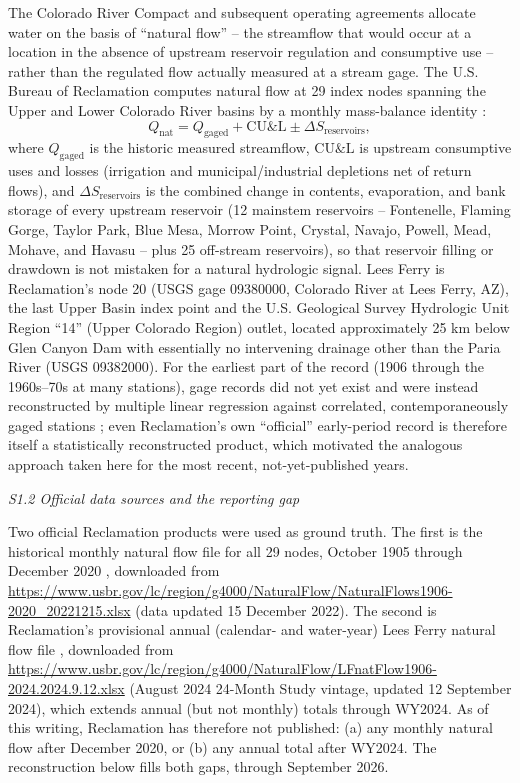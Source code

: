 \documentclass[draft,grl]{agutexSI2019}
\begin{document}
\begin{article}
The Colorado River Compact and subsequent operating agreements allocate water on the basis of ``natural flow'' -- the streamflow that would occur at a location in the absence of upstream reservoir regulation and consumptive use -- rather than the regulated flow actually measured at a stream gage. The U.S. Bureau of Reclamation computes natural flow at 29 index nodes spanning the Upper and Lower Colorado River basins by a monthly mass-balance identity \cite{prairie2005}:
\begin{equation}
Q_{\mathrm{nat}} = Q_{\mathrm{gaged}} + \mathrm{CU\&L} \pm \Delta S_{\mathrm{reservoirs}},
\end{equation}
where $Q_{\mathrm{gaged}}$ is the historic measured streamflow, $\mathrm{CU\&L}$ is upstream consumptive uses and losses (irrigation and municipal/industrial depletions net of return flows), and $\Delta S_{\mathrm{reservoirs}}$ is the combined change in contents, evaporation, and bank storage of every upstream reservoir (12 mainstem reservoirs -- Fontenelle, Flaming Gorge, Taylor Park, Blue Mesa, Morrow Point, Crystal, Navajo, Powell, Mead, Mohave, and Havasu -- plus 25 off-stream reservoirs), so that reservoir filling or drawdown is not mistaken for a natural hydrologic signal. Lees Ferry is Reclamation's node 20 (USGS gage 09380000, Colorado River at Lees Ferry, AZ), the last Upper Basin index point and the U.S. Geological Survey Hydrologic Unit Region ``14'' (Upper Colorado Region) outlet, located approximately 25 km below Glen Canyon Dam with essentially no intervening drainage other than the Paria River (USGS 09382000). For the earliest part of the record (1906 through the 1960s--70s at many stations), gage records did not yet exist and were instead reconstructed by multiple linear regression against correlated, contemporaneously gaged stations \cite{usbr2006recordext}; even Reclamation's own ``official'' early-period record is therefore itself a statistically reconstructed product, which motivated the analogous approach taken here for the most recent, not-yet-published years.

\noindent\textit{S1.2 Official data sources and the reporting gap}

Two official Reclamation products were used as ground truth. The first is the historical monthly natural flow file for all 29 nodes, October 1905 through December 2020 \cite{usbr_naturalflow2022}, downloaded from \url{https://www.usbr.gov/lc/region/g4000/NaturalFlow/NaturalFlows1906-2020_20221215.xlsx} (data updated 15 December 2022). The second is Reclamation's provisional annual (calendar- and water-year) Lees Ferry natural flow file \cite{usbr_naturalflowprov2024}, downloaded from \url{https://www.usbr.gov/lc/region/g4000/NaturalFlow/LFnatFlow1906-2024.2024.9.12.xlsx} (August 2024 24-Month Study vintage, updated 12 September 2024), which extends annual (but not monthly) totals through WY2024. As of this writing, Reclamation has therefore not published: (a) any monthly natural flow after December 2020, or (b) any annual total after WY2024. The reconstruction below fills both gaps, through September 2026.


\end{article}
\end{document}
